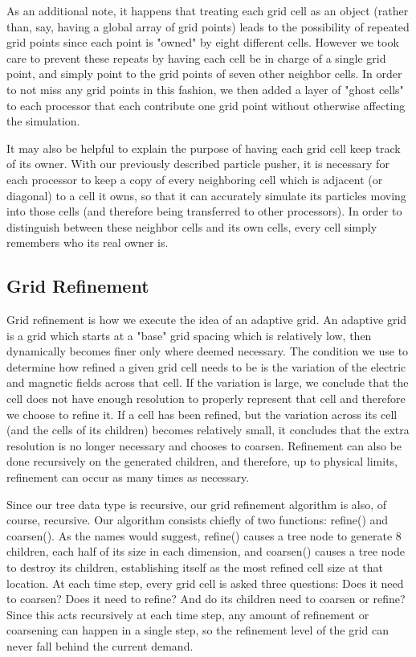 \documentclass[]{article}
\begin{document}
As an additional note, it happens that treating each grid cell as an object (rather than, say, having a global array of grid points) leads to the possibility of repeated grid points since each point is "owned" by eight different cells. However we took care to prevent these repeats by having each cell be in charge of a single grid point, and simply point to the grid points of seven other neighbor cells. In order to not miss any grid points in this fashion, we then added a layer of "ghost cells" to each processor that each contribute one grid point without otherwise affecting the simulation.

It may also be helpful to explain the purpose of having each grid cell keep track of its owner. With our previously described particle pusher, it is necessary for each processor to keep a copy of every neighboring cell which is adjacent (or diagonal) to a cell it owns, so that it can accurately simulate its particles moving into those cells (and therefore being transferred to other processors). In order to distinguish between these neighbor cells and its own cells, every cell simply remembers who its real owner is.

\subsection{Grid Refinement}
Grid refinement is how we execute the idea of an adaptive grid. An adaptive grid is a grid which starts at a "base" grid spacing which is relatively low, then dynamically becomes finer only where deemed necessary. The condition we use to determine how refined a given grid cell needs to be is the variation of the electric and magnetic fields across that cell. If the variation is large, we conclude that the cell does not have enough resolution to properly represent that cell and therefore we choose to refine it. If a cell has been refined, but the variation across its cell (and the cells of its children) becomes relatively small, it concludes that the extra resolution is no longer necessary and chooses to coarsen. Refinement can also be done recursively on the generated children, and therefore, up to physical limits, refinement can occur as many times as necessary.

Since our tree data type is recursive, our grid refinement algorithm is also, of course, recursive. Our algorithm consists chiefly of two functions: refine() and coarsen(). As the names would suggest, refine() causes a tree node to generate 8 children, each half of its size in each dimension, and coarsen() causes a tree node to destroy its children, establishing itself as the most refined cell size at that location. At each time step, every grid cell is asked three questions: Does it need to coarsen? Does it need to refine? And do its children need to coarsen or refine? Since this acts recursively at each time step, any amount of refinement or coarsening can happen in a single step, so the refinement level of the grid can never fall behind the current demand.
\end{document}
